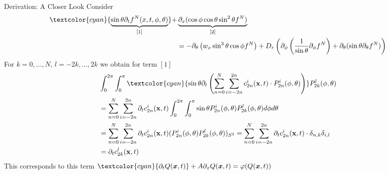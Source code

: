 \begin{frame}{Derivation: A Closer Look}
\scriptsize
Consider 
\begin{align*}
	\textcolor{cyan}{\underbrace{\sin\theta \partial_{t}f^N(x,t,\phi,\theta)}_{[1]}} + &  \underbrace{\partial_x (\cos\phi \cos\theta \sin^2\theta f^N)}_{[2]} \\
	& 
	= -\partial_\theta \left(w_x \sin^3 \theta \cos \phi f^N\right) + D_{r} \left(\partial_\phi \left(\frac{1}{\sin \theta} \partial_\phi f^N \right) + \partial_\theta (\sin \theta \partial_\theta f^N) \right)
\end{align*}
\pause
For $k=0, \ldots, N$, $l=-2k, \ldots, 2k$ we obtain for term $[1]$
\begin{align*}
	&\int_{0}^{2\pi} \int_{0}^{\pi} \textcolor{cyan}{\sin\theta \partial_t \left(\sum_{n=0}^{N} \sum_{i=-2n}^{2n} c^i_{2n}(\textbf{x},t) \cdot P^i_{2n}(\phi, \theta)\right)}P^l_{2k}(\phi, \theta) \\
	&= \sum_{n=0}^{N} \sum_{i=-2n}^{2n} \partial_t c^i_{2n}(\textbf{x},t) \int_{0}^{2\pi} \int_{0}^{\pi} \sin\theta P^i_{2n}(\phi, \theta) P^l_{2k}(\phi, \theta) d\phi d\theta \\
	&=  \sum_{n=0}^{N} \sum_{i=-2n}^{2n} \partial_t c^i_{2n}(\textbf{x},t) (P^i_{2n}(\phi, \theta) P^l_{2k}(\phi, \theta))_{S^2} =  \sum_{n=0}^{N} \sum_{i=-2n}^{2n} \partial_t c^i_{2n}(\textbf{x},t) \cdot \delta_{n,k} \delta_{i,l} \\
	&= \partial_t c^l_{2k}(\textbf{x},t)
\end{align*}
\pause
This corresponds to this term
$\textcolor{cyan}{\partial_t Q(\boldsymbol{x},t)} + A\partial_x Q(\boldsymbol{x},t) = \varphi (Q(\boldsymbol{x},t))$
\end{frame}

